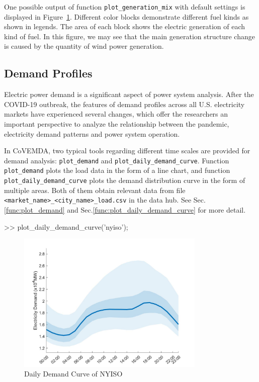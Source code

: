 \documentclass[10pt]{article}
\newcommand{\covemda}{CoVEMDA}
\numberwithin{equation}{section}
\numberwithin{table}{section}
\numberwithin{figure}{section}
\begin{document}
One possible output of function \verb!plot_generation_mix! with default settings is displayed in Figure~\ref{fig:vis_1}. Different color blocks demonstrate different fuel kinds as shown in legends. The area of each block shows the electric generation of each kind of fuel. In this figure, we may see that the main generation structure change is caused by the quantity of wind power generation.



\subsection{Demand Profiles}

Electric power demand is a significant aspect of power system analysis. After the COVID-19 outbreak, the features of demand profiles across all U.S. electricity markets have experienced several changes, which offer the researchers an important perspective to analyze the relationship between the pandemic, electricity demand patterns and power system operation.

In \covemda{}, two typical tools regarding different time scales are provided for demand analysis: \verb!plot_demand! and \verb!plot_daily_demand_curve!. Function \verb!plot_demand! plots the load data in the form of a line chart, and function \verb!plot_daily_demand_curve! plots the demand distribution curve in the form of multiple areas. Both of them obtain relevant data from file \verb!<market_name>_<city_name>_load.csv! in the data hub. See Sec.\ref{func:plot_demand} and Sec.\ref{func:plot_daily_demand_curve} for more detail.

\begin{Code}
>> plot_daily_demand_curve('nyiso');
\end{Code}

\begin{figure}
  \centering
  \noindent\includegraphics[width=0.8\textwidth]{figures/visualization_plot_daily_demand_curve.jpg}
  \caption{Daily Demand Curve of NYISO} \label{fig:vis_1}
\end{figure}
\end{document}
